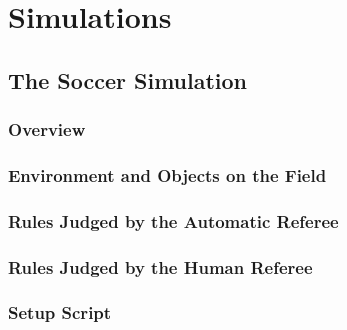 \chapter{Simulations}

\section{The Soccer Simulation}

\subsection{Overview}

\subsection{Environment and Objects on the Field}

\subsection{Rules Judged by the Automatic Referee}

\subsection{Rules Judged by the Human Referee}

\subsection{Setup Script}

